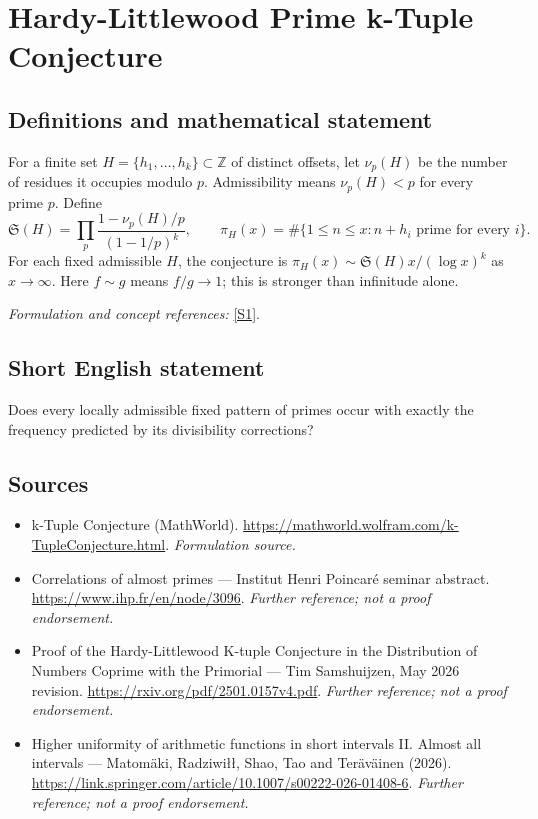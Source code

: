 \documentclass[11pt]{article}
\begin{document}
\section*{\texorpdfstring{Hardy-Littlewood Prime k-Tuple Conjecture}{Hardy-Littlewood Prime k-Tuple Conjecture}}\label{30006682}
\subsection{Definitions and mathematical statement}
For a finite set $H=\{h_1,\ldots,h_k\}\subset{\mathbb{Z}}$ of distinct offsets, let $\nu_p(H)$ be the number of residues it occupies modulo $p$. Admissibility means $\nu_p(H)<p$ for every prime $p$. Define
\[
 \mathfrak S(H)=\prod_p\frac{1-\nu_p(H)/p}{(1-1/p)^k},\qquad
 \pi_H(x)=\#\{1\le n\le x:n+h_i\text{ prime for every }i\}.
\]
For each fixed admissible $H$, the conjecture is $\pi_H(x)\sim\mathfrak S(H)x/(\log x)^k$ as $x\to\infty$. Here $f\sim g$ means $f/g\to1$; this is stronger than infinitude alone.
\par\smallskip\textit{Formulation and concept references:} \href{https://mathworld.wolfram.com/k-TupleConjecture.html}{[S1]}.

\subsection{Short English statement}
Does every locally admissible fixed pattern of primes occur with exactly the frequency predicted by its divisibility corrections?
\subsection{Sources}
\begin{itemize}
\item[S1]k-Tuple Conjecture (MathWorld).
\url{https://mathworld.wolfram.com/k-TupleConjecture.html}.
\textit{Formulation source.}
\item[S2]Correlations of almost primes — Institut Henri Poincaré seminar abstract.
\url{https://www.ihp.fr/en/node/3096}.
\textit{Further reference; not a proof endorsement.}
\item[S3]Proof of the Hardy-Littlewood K-tuple Conjecture in the Distribution of Numbers Coprime with the Primorial — Tim Samshuijzen, May 2026 revision.
\url{https://rxiv.org/pdf/2501.0157v4.pdf}.
\textit{Further reference; not a proof endorsement.}
\item[S4]Higher uniformity of arithmetic functions in short intervals II. Almost all intervals — Matomäki, Radziwiłł, Shao, Tao and Teräväinen (2026).
\url{https://link.springer.com/article/10.1007/s00222-026-01408-6}.
\textit{Further reference; not a proof endorsement.}
\end{itemize}
\end{document}
